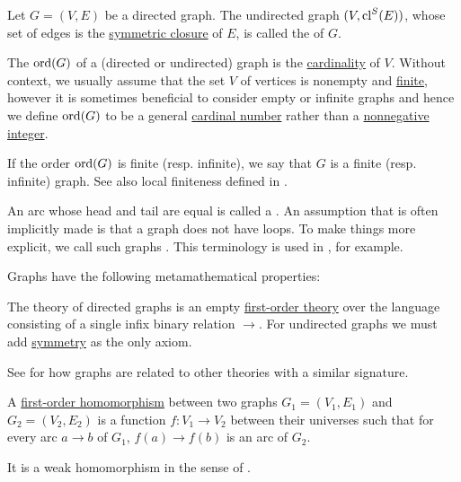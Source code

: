 \begin{definition}
\begin{thmenum}[series=def:graph]
     Let \( G = (V, E) \) be a directed graph. The undirected graph \( (V, \operatorname{cl}^S(E)) \), whose set of edges is the \hyperref[def:derived_relations/symmetric]{symmetric closure} of \( E \), is called the  of \( G \).

     The  \( \operatorname{ord}(G) \) of a (directed or undirected) graph is the \hyperref[thm:cardinality_existence]{cardinality} of \( V \). Without context, we usually assume that the set \( V \) of vertices is nonempty and \hyperref[def:set_finiteness]{finite}, however it is sometimes beneficial to consider empty or infinite graphs and hence we define \( \operatorname{ord}(G) \) to be a general \hyperref[def:cardinal]{cardinal number} rather than a \hyperref[rem:peano_arithmetic_zero/nonnegative]{nonnegative integer}.

    If the order \( \operatorname{ord}(G) \) is finite (resp. infinite), we say that \( G \) is a finite (resp. infinite) graph. See also local finiteness defined in .

     An arc whose head and tail are equal is called a . An assumption that is often implicitly made is that a graph does not have loops. To make things more explicit, we call such graphs . This terminology is used in , for example.
  \end{thmenum}

  Graphs have the following metamathematical properties:
  \begin{thmenum}[resume=def:graph]
     The theory of directed graphs is an empty \hyperref[def:first_order_theory]{first-order theory} over the language consisting of a single infix binary relation \( \to \). For undirected graphs we must add \hyperref[def:binary_relation/symmetric]{symmetry} as the only axiom.

    See  for how graphs are related to other theories with a similar signature.

     A \hyperref[def:first_order_homomorphism]{first-order homomorphism} between two graphs \( G_1 = (V_1, E_1) \) and \( G_2 = (V_2, E_2) \) is a function \( f: V_1 \to V_2 \) between their universes such that for every arc \( a \to b \) of \( G_1 \), \( f(a) \to f(b) \) is an arc of \( G_2 \).

    It is a weak homomorphism in the sense of .


\end{thmenum}
\end{definition}
